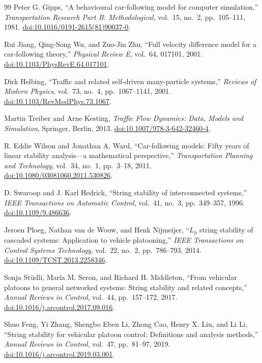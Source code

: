 \documentclass[11pt,a4paper,openany]{book}
\numberwithin{equation}{chapter}
\numberwithin{figure}{chapter}
\numberwithin{table}{chapter}
\begin{document}
\begin{thebibliography}{99}
Peter G. Gipps,
``A behavioural car-following model for computer simulation,''
\emph{Transportation Research Part B: Methodological}, vol.~15, no.~2, pp.~105--111, 1981.
\href{https://doi.org/10.1016/0191-2615(81)90037-0}{doi:10.1016/0191-2615(81)90037-0}.

Rui Jiang, Qing-Song Wu, and Zuo-Jin Zhu,
``Full velocity difference model for a car-following theory,''
\emph{Physical Review E}, vol.~64, 017101, 2001.
\href{https://doi.org/10.1103/PhysRevE.64.017101}{doi:10.1103/PhysRevE.64.017101}.

Dirk Helbing,
``Traffic and related self-driven many-particle systems,''
\emph{Reviews of Modern Physics}, vol.~73, no.~4, pp.~1067--1141, 2001.
\href{https://doi.org/10.1103/RevModPhys.73.1067}{doi:10.1103/RevModPhys.73.1067}.

Martin Treiber and Arne Kesting,
\emph{Traffic Flow Dynamics: Data, Models and Simulation},
Springer, Berlin, 2013.
\href{https://doi.org/10.1007/978-3-642-32460-4}{doi:10.1007/978-3-642-32460-4}.

R. Eddie Wilson and Jonathan A. Ward,
``Car-following models: Fifty years of linear stability analysis---a mathematical perspective,''
\emph{Transportation Planning and Technology}, vol.~34, no.~1, pp.~3--18, 2011.
\href{https://doi.org/10.1080/03081060.2011.530826}{doi:10.1080/03081060.2011.530826}.

D. Swaroop and J. Karl Hedrick,
``String stability of interconnected systems,''
\emph{IEEE Transactions on Automatic Control}, vol.~41, no.~3, pp.~349--357, 1996.
\href{https://doi.org/10.1109/9.486636}{doi:10.1109/9.486636}.

Jeroen Ploeg, Nathan van de Wouw, and Henk Nijmeijer,
``$L_p$ string stability of cascaded systems: Application to vehicle platooning,''
\emph{IEEE Transactions on Control Systems Technology}, vol.~22, no.~2, pp.~786--793, 2014.
\href{https://doi.org/10.1109/TCST.2013.2258346}{doi:10.1109/TCST.2013.2258346}.

Sonja St\"udli, María M. Seron, and Richard H. Middleton,
``From vehicular platoons to general networked systems: String stability and related concepts,''
\emph{Annual Reviews in Control}, vol.~44, pp.~157--172, 2017.
\href{https://doi.org/10.1016/j.arcontrol.2017.09.016}{doi:10.1016/j.arcontrol.2017.09.016}.

Shuo Feng, Yi Zhang, Shengbo Eben Li, Zhong Cao, Henry X. Liu, and Li Li,
``String stability for vehicular platoon control: Definitions and analysis methods,''
\emph{Annual Reviews in Control}, vol.~47, pp.~81--97, 2019.
\href{https://doi.org/10.1016/j.arcontrol.2019.03.001}{doi:10.1016/j.arcontrol.2019.03.001}.


\end{thebibliography}
\end{document}
